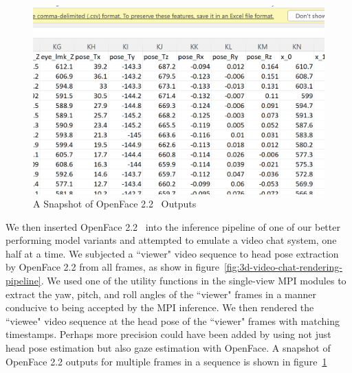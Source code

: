 \begin{figure}[!h]
    \includegraphics[width=0.75\columnwidth]{figures/openface-csv.png}
    \caption{A Snapshot of OpenFace 2.2~\cite{baltrusaitis_openface_2018} Outputs}
    \label{fig:openface-outputs}
\end{figure}

We then inserted OpenFace 2.2~\cite{baltrusaitis_openface_2018} into the inference pipeline of one of our better performing model variants and attempted to emulate a video chat system, one half at a time. We subjected a ``viewer" video sequence to head pose extraction by OpenFace 2.2 from all frames, as show in figure~\ref{fig:3d-video-chat-rendering-pipeline}. We used one of the utility functions in the single-view MPI modules to extract the yaw, pitch, and roll angles of the ``viewer" frames in a manner conducive to being accepted by the MPI inference. We then rendered the ``viewee" video sequence at the head pose of the ``viewer" frames with matching timestamps. Perhaps more precision could have been added by using not just head pose estimation but also gaze estimation with OpenFace. A snapshot of OpenFace 2.2 outputs for multiple frames in a sequence is shown in figure~\ref{fig:openface-outputs}